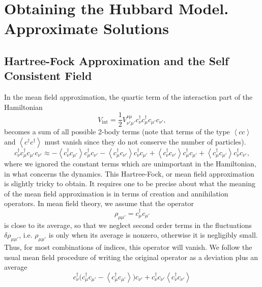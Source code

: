 \chapter{Obtaining the Hubbard Model. Approximate Solutions}
\label{ap:hubbardObSol}


\section{Hartree-Fock Approximation and the Self Consistent Field}\label{sec:hartree-fock}

In the mean field approximation, the quartic term of the interaction part of the Hamiltonian
\begin{equation*}
V_{\text{int}} = \frac{1}{2} V^{\nu\mu}_{\nu'\mu'} c_\nu^\dagger c_\mu^\dagger c_{\mu'} c_{\nu'} ,
\end{equation*} 
becomes a sum of all possible 2-body terms (note that terms of the type $\left\langle cc \right\rangle$ and $\left\langle c^\dagger c^\dagger \right\rangle$ must vanish since they do not conserve the number of particles).
\begin{equation}\label{eq:c_mft}
c_\nu^\dagger c_\mu^\dagger c_{\mu'} c_{\nu'} \approx - \left\langle c_\nu^\dagger c_{\mu'} \right\rangle  c_{\mu}^\dagger c_{\nu'} - \left\langle c_{\mu}^\dagger c_{\nu'} \right\rangle c_{\nu}^\dagger c_{\mu'} + \left\langle c_{\nu}^\dagger c_{\nu'} \right\rangle  c_{\mu}^\dagger c_{\mu'} + \left\langle c_{\mu}^\dagger c_{\mu'} \right\rangle  c_{\nu}^\dagger c_{\nu'} ,
\end{equation}
where we ignored the constant terms which are unimportant in the Hamiltonian, in what concerns the dynamics. 
This Hartree-Fock, or mean field approximation is slightly tricky to obtain. 
It requires one to be precise about what the meaning of the mean field approximation is in terms of creation and annihilation operators. In mean field theory, we assume that the operator
\begin{equation}
\rho_{\mu\mu'} = c_{\mu}^\dagger c_{\mu'}
\end{equation}
is close to its average, so that we neglect second order terms in the fluctuations $\delta \rho_{\mu\mu'}$, i.e. $\rho_{\mu\mu'}$ is  only when its average is nonzero, otherwise it is negligibly small. Thus, for most combinations of indices, this operator will vanish. We follow the usual mean field procedure of writing the original operator as a deviation plus an average
\begin{equation}\label{eq:hartree}
c_{\nu}^\dagger \bigg( c_\mu^\dagger c_{\mu'} - \left\langle c_\mu^\dagger c_{\mu'} \right\rangle \bigg) c_{\nu'} + c_{\nu}^\dagger c_{\nu'} \left\langle c_\nu^\dagger c_{\nu'} \right\rangle
\end{equation}

